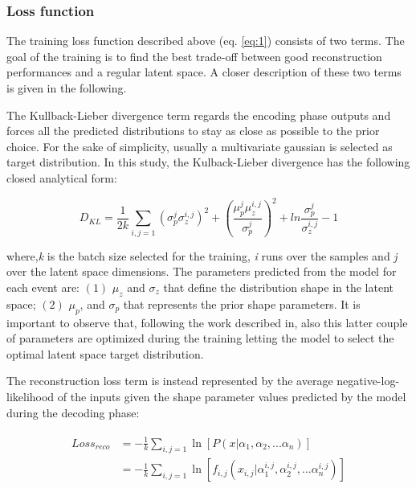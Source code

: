 \subsubsection{Loss function}
\label{subsubsec:loss}
The training loss function described above (eq. \ref{eq:1}) consists of two terms. The goal of the training is to find the best trade-off between good reconstruction performances and a regular latent space. A closer description of these two terms is given in the following.

The Kullback-Lieber divergence term regards the encoding phase outputs and forces all the predicted distributions to stay as close as possible to the prior choice. For the sake of simplicity, usually a multivariate gaussian is selected as target distribution. In this study, the Kulback-Lieber divergence has the following closed analytical form:

\begin{equation}\label{eq:2}
    D_{KL}=  \frac{1}{2k}  \sum_{i,j=1} \left( \sigma_{p}^{j}\sigma_{z}^{i,j} \right)^{2} +
\left( \frac{\mu_{p}^{j}\mu_{z}^{i,j}}{\sigma_{p}^{j}} \right)^{2} +
ln{\frac{\sigma_{p}^{j}}{\sigma_{z}^{i,j}}} -1 
\end{equation}

where,\textit{k} is the batch size selected for the training, \textit{i} runs over the samples and \textit{j} over the latent space dimensions. The parameters predicted from the model for each event are: $(1)$ $\mu_{z}$  and $\sigma_{z}$ that define the distribution shape in the latent space; $(2)$ $\mu_{p}$, and $\sigma_{p}$ that represents the prior shape parameters. It is important to observe that, following the work described in, also this latter couple of parameters are optimized during the training letting the model to select the optimal latent space target distribution.

The reconstruction loss term is instead represented by the average negative-log-likelihood of the inputs given the shape parameter values predicted by the model during the decoding phase:

\begin{align}\label{eq:3}
\begin{split}
    Loss_{reco}&=  -\frac{1}{k} \sum_{i,j=1} \ln \left[
    P\left(x| \alpha_{1}, \alpha_{2},...\alpha_{n}\right)
    \right]   \\
    &=  -\frac{1}{k} \sum_{i,j=1} \ln \left[
    f_{i,j}\left(x_{i,j}| \alpha_{1}^{i,j}, \alpha_{2}^{i,j},...\alpha_{n}^{i,j}\right)
    \right]   
\end{split}
\end{align}

